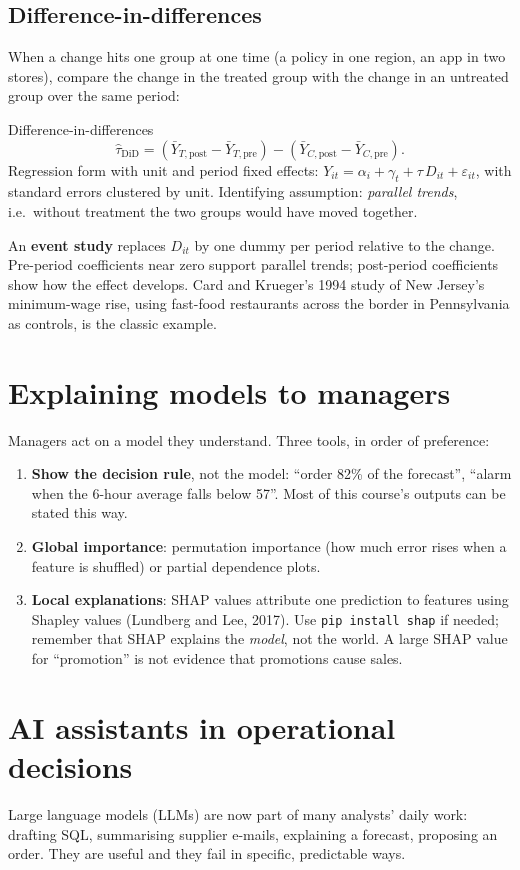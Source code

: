 \subsection{Difference-in-differences}
When a change hits one group at one time (a policy in one region, an app in two stores), compare the change in the
treated group with the change in an untreated group over the same period:
\begin{keyformula}{Difference-in-differences}
\[ \hat\tau_{\text{DiD}}=(\bar Y_{T,\text{post}}-\bar Y_{T,\text{pre}})-(\bar Y_{C,\text{post}}-\bar Y_{C,\text{pre}}). \]
Regression form with unit and period fixed effects: $Y_{it}=\alpha_i+\gamma_t+\tau\,D_{it}+\varepsilon_{it}$, with
standard errors clustered by unit. Identifying assumption: \emph{parallel trends}, i.e.\ without treatment the two groups
would have moved together.
\end{keyformula}
An \textbf{event study} replaces $D_{it}$ by one dummy per period relative to the change. Pre-period coefficients near
zero support parallel trends; post-period coefficients show how the effect develops. Card and Krueger's 1994 study
of New Jersey's minimum-wage rise, using fast-food restaurants across the border in Pennsylvania as controls, is the
classic example.

\section{Explaining models to managers}
Managers act on a model they understand. Three tools, in order of preference:
\begin{enumerate}[nosep]
\item \textbf{Show the decision rule}, not the model: ``order 82\% of the forecast'', ``alarm when the 6-hour average
falls below 57''. Most of this course's outputs can be stated this way.
\item \textbf{Global importance}: permutation importance (how much error rises when a feature is shuffled) or partial
dependence plots.
\item \textbf{Local explanations}: SHAP values attribute one prediction to features using Shapley values
(Lundberg and Lee, 2017). Use \texttt{pip install shap} if needed; remember that SHAP explains the \emph{model}, not
the world. A large SHAP value for ``promotion'' is not evidence that promotions cause sales.
\end{enumerate}

\section{AI assistants in operational decisions}
Large language models (LLMs) are now part of many analysts' daily work: drafting SQL, summarising supplier e-mails,
explaining a forecast, proposing an order. They are useful and they fail in specific, predictable ways.

